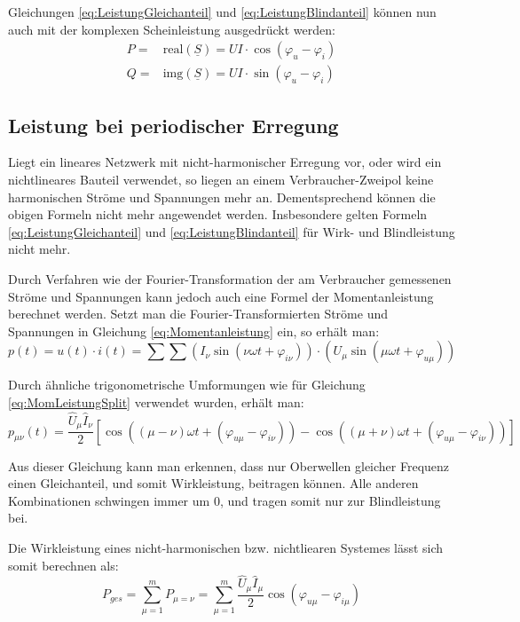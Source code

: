Gleichungen \eqref{eq:LeistungGleichanteil} und \eqref{eq:LeistungBlindanteil} können nun auch mit der komplexen Scheinleistung ausgedrückt werden:
\begin{eqnarray*}
P=& \mbox{real}(\underline{S}) = UI\cdot \cos(\varphi_u-\varphi_i)\\
Q=& \mbox{img}(\underline{S}) = UI\cdot \sin(\varphi_u-\varphi_i)
\end{eqnarray*}

\subsection{Leistung bei periodischer Erregung}
Liegt ein lineares Netzwerk mit nicht-harmonischer Erregung vor, oder wird ein nichtlineares Bauteil verwendet, so liegen an einem Verbraucher-Zweipol keine harmonischen Ströme und Spannungen mehr an. Dementsprechend können die obigen Formeln nicht mehr angewendet werden. Insbesondere gelten Formeln \eqref{eq:LeistungGleichanteil} und \eqref{eq:LeistungBlindanteil} für Wirk- und Blindleistung nicht mehr.

Durch Verfahren wie der Fourier-Transformation der am Verbraucher gemessenen Ströme und Spannungen kann jedoch auch eine Formel der Momentanleistung berechnet werden. Setzt man die Fourier-Transformierten Ströme und Spannungen in Gleichung \eqref{eq:Momentanleistung} ein, so erhält man:
\begin{equation*}
p(t)=u(t)\cdot i(t) = \sum\sum\left(I_\nu\sin(\nu \omega t+ \varphi_{i\nu})\right) \cdot \left(U_\mu\sin(\mu \omega t + \varphi_{u\mu})\right)
\end{equation*}

Durch ähnliche trigonometrische Umformungen wie für Gleichung \eqref{eq:MomLeistungSplit} verwendet wurden, erhält man:
\begin{equation}
p_{\mu\nu}(t)=\frac{\hat{U}_\mu\hat{I}_\nu}{2}\left[\cos((\mu-\nu)\omega t + (\varphi_{u\mu}-\varphi_{i\nu}))-\cos((\mu+\nu)\omega t + (\varphi_{u\mu}-\varphi_{i\nu}))\right]
\end{equation}

Aus dieser Gleichung kann man erkennen, dass nur Oberwellen gleicher Frequenz einen Gleichanteil, und somit Wirkleistung, beitragen können. Alle anderen Kombinationen schwingen immer um 0, und tragen somit nur zur Blindleistung bei.

Die Wirkleistung eines nicht-harmonischen bzw. nichtliearen Systemes lässt sich somit berechnen als:
\begin{equation}
P_{ges}=\sum_{\mu = 1}^mP_{\mu=\nu}=\sum_{\mu = 1}^m\frac{\hat{U}_\mu\hat{I}_\mu}{2}\cos(\varphi_{u\mu}-\varphi_{i\mu})
\end{equation}

